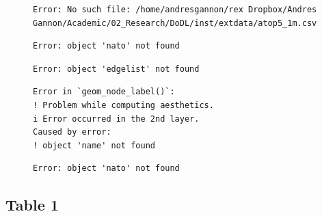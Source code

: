 \documentclass[
  12,
  letterpaper,
  DIV=11,
  numbers=noendperiod]{scrartcl}
\begin{document}
\begin{figure}

\begin{minipage}{0.50\linewidth}

\begin{verbatim}
Error: No such file: /home/andresgannon/rex Dropbox/Andres Gannon/Academic/02_Research/DoDL/inst/extdata/atop5_1m.csv
\end{verbatim}

\end{minipage}%
%
\begin{minipage}{0.50\linewidth}

\begin{verbatim}
Error: object 'nato' not found
\end{verbatim}

\end{minipage}%
\newline
\begin{minipage}{0.50\linewidth}

\begin{verbatim}
Error: object 'edgelist' not found
\end{verbatim}

\end{minipage}%
%
\begin{minipage}{0.50\linewidth}

\begin{verbatim}
Error in `geom_node_label()`:
! Problem while computing aesthetics.
i Error occurred in the 2nd layer.
Caused by error:
! object 'name' not found
\end{verbatim}

\end{minipage}%
\newline
\begin{minipage}{0.50\linewidth}

\begin{verbatim}
Error: object 'nato' not found
\end{verbatim}

\end{minipage}%

\end{figure}%

\newpage

\subsection{Table 1}\label{table-1}
\end{document}
